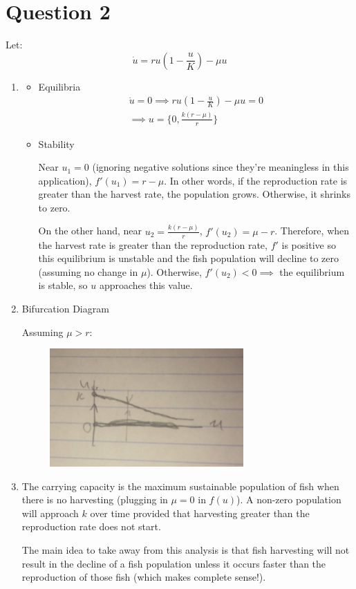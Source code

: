 \documentclass[12pt,a4paper]{article}
\begin{document}
\section{Question 2}
Let:
$$\dot{u} = ru\left(1 - \frac{u}{K}\right) - \mu u$$

\begin{enumerate}[label = (\roman*)]
    \item
        \begin{itemize}
            \item Equilibria
            \begin{align}
            \dot{u} = 0 \implies ru\left(1 - \frac{u}{K}\right) - \mu u = 0 \\
            \implies u = \{0, \frac{k(r - \mu)}{r}\}
            \end{align}
            \item Stability

            Near $u_1 = 0$ (ignoring negative solutions since they're meaningless in this application), $f'(u_1) = r - \mu$. In other words, if the reproduction rate is greater than the harvest rate, the population grows. Otherwise, it shrinks to zero.

            On the other hand, near  $u_2 = \frac{k(r - \mu)}{r}$, $f'(u_2) = \mu - r$. Therefore, when the harvest rate is greater than the reproduction rate, $f'$ is positive so this equilibrium is unstable and the fish population will decline to zero (assuming no change in $\mu$). Otherwise, $f'(u_2) < 0 \implies$ the equilibrium is stable, so $u$ approaches this value.
        \end{itemize}
    \item Bifurcation Diagram

    Assuming $\mu > r$:

    \begin{figure}[H]
        \centering
        \includegraphics[width=0.7\textwidth]{bifurcation-diagram}
    \end{figure}

    \item The carrying capacity is the maximum sustainable population of fish when there is no harvesting (plugging in $\mu = 0$ in $f(u)$). A non-zero population will approach $k$ over time provided that harvesting greater than the reproduction rate does not start.

    The main idea to take away from this analysis is that fish harvesting will not result in the decline of a fish population unless it occurs faster than the reproduction of those fish (which makes complete sense!).

\end{enumerate}
\end{document}
